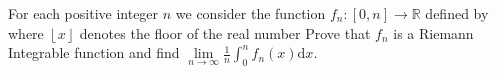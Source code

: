 For each positive integer $n$ we consider the function $f_{n}:[0,n]\rightarrow{\mathbb{R}}$ defined by  where $\left\lfloor x\right\rfloor $ denotes the floor of the real number  Prove that $f_{n}$ is a Riemann Integrable function and find $\underset{n\rightarrow\infty}{\lim}\frac{1}{n}\int_{0}^{n}f_{n}(x)\mathrm{d}x.$